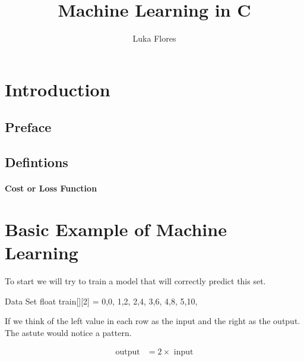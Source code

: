 \documentclass{report}
\title{\Huge{{Machine Learning in C}}}
\author{\huge{Luka Flores}}
\begin{document}
\maketitle
\newpage%
\tableofcontents
\pagebreak


\chapter{Introduction} %
\label{chap:Introduction}

\section{Preface} %
\label{sec:Preface}




\section{Defintions} %
\label{sec:Defintions}

\subsubsection{Cost or Loss Function} %
\label{sec:Cost or Loss Function}





\chapter{Basic Example of Machine Learning} %
\label{chap:Basic Example of Machine Learning}


To start we will try to train a model that will correctly predict this set.

\begin{code}[language=c]{Data Set}
float train[][2] = {
    {0,0},
    {1,2},
    {2,4},
    {3,6},
    {4,8},
    {5,10},
}
\end{code}


If we think of the left value in each row as the input and the right as the output. The astute would notice a pattern.

\begin{align*}
    \text{output} &= 2 \times \text{ input} \\
\end{align*}
\end{document}
